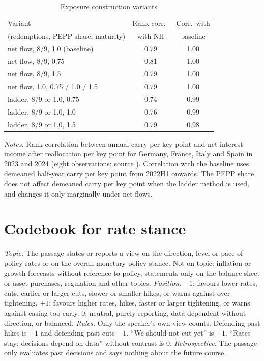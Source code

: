 \documentclass[11pt]{article}
\theoremstyle{plain}
\begin{document}
\begin{table}[h]\centering\small
\begin{threeparttable}
\caption{Exposure construction variants}\label{tab:grid}
\begin{tabular}{lcc}
\toprule
Variant & Rank corr.\ & Corr.\ with \\
(redemptions, PEPP share, maturity) & with NII & baseline \\
\midrule
net flow, 8/9, 1.0 (baseline) & 0.79 & 1.00 \\
net flow, 8/9, 0.75 & 0.81 & 1.00 \\
net flow, 8/9, 1.5 & 0.79 & 1.00 \\
net flow, 1.0, 0.75 / 1.0 / 1.5 & 0.79 & 1.00 \\
ladder, 8/9 or 1.0, 0.75 & 0.74 & 0.99 \\
ladder, 8/9 or 1.0, 1.0 & 0.76 & 0.99 \\
ladder, 8/9 or 1.0, 1.5 & 0.79 & 0.98 \\
\bottomrule
\end{tabular}
\begin{tablenotes}\footnotesize
\item \textit{Notes:} Rank correlation between annual carry per key point and net interest income after reallocation per key point for Germany, France, Italy and Spain in 2023 and 2024 (eight observations; source \citealp{arrata2026}). Correlation with the baseline uses demeaned half-year carry per key point from 2022H1 onwards. The PEPP share does not affect demeaned carry per key point when the ladder method is used, and changes it only marginally under net flows.
\end{tablenotes}
\end{threeparttable}
\end{table}

\section{Codebook for rate stance}\label{app:codebook}
\textit{Topic.} The passage states or reports a view on the direction, level or pace of policy rates or on the overall monetary policy stance. Not on topic: inflation or growth forecasts without reference to policy, statements only on the balance sheet or asset purchases, regulation and other topics.
\textit{Position.} $-1$: favours lower rates, cuts, earlier or larger cuts, slower or smaller hikes, or warns against over-tightening. $+1$: favours higher rates, hikes, faster or larger tightening, or warns against easing too early. $0$: neutral, purely reporting, data-dependent without direction, or balanced.
\textit{Rules.} Only the speaker's own view counts. Defending past hikes is $+1$ and defending past cuts $-1$. ``We should not cut yet'' is $+1$. ``Rates stay; decisions depend on data'' without contrast is $0$.
\textit{Retrospective.} The passage only evaluates past decisions and says nothing about the future course.
\end{document}
